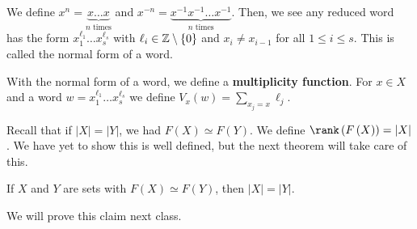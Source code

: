\begin{remark}
	We define \(x^{n} = \underbrace{x\ldots x}_{n \text{ times}} \) and \(x^{-n} = \underbrace{x^{-1} x^{-1} \ldots x^{-1}}_{n \text{ times}} \). Then, we see any reduced word has the form \(x_1^{\ell_1} \ldots x_{s}^{\ell_{s}}\) with \(\ell_{i} \in \mathbb{Z} \setminus \{0\} \)  and \(x_{i} \neq x_{i-1}\) for all \(1 \le i \le s\). This is called the normal form of a word.
\end{remark}
\begin{definition}
	With the normal form of a word, we define a \textbf{multiplicity function}. For \(x \in X\) and a word \(w = x_1^{\ell_1} \ldots x_{s}^{\ell_{s}}\) we define \(V_{x}\left( w \right)  = \sum_{x_{j} = x}^{} \ell_{j}\).
\end{definition}
\begin{definition}[Rank]
	Recall that if \(\left| X \right|  = \left| Y \right| \), we had \(F\left( X \right)  \simeq F\left( Y \right) \). We define \(\rank \left( F\left( X \right)  \right)  = \left| X \right| \). We have yet to show this is well defined, but the next theorem will take care of this.
\end{definition}
\begin{theorem}
	If \(X\)  and \(Y\) are sets with \(F\left( X \right)  \simeq F\left( Y \right) \), then \(\left| X \right|  = \left| Y \right| \).
\end{theorem}
We will prove this claim next class.
